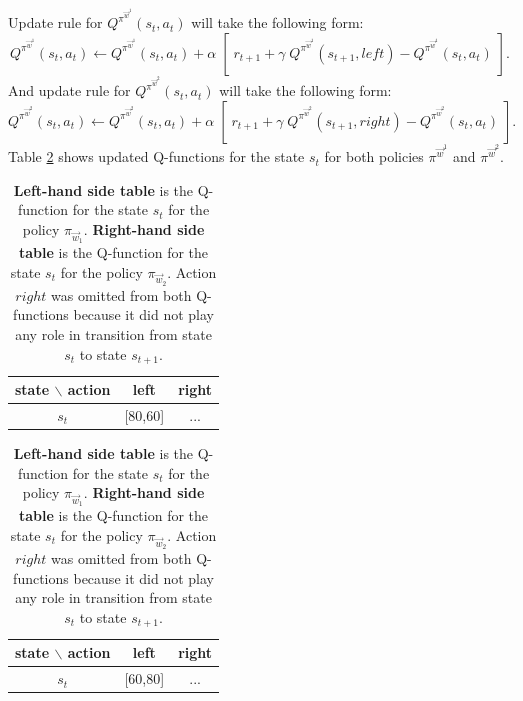 {Update rule for $ Q^{ \pi^{\vec{w}^{1}} }(s_{t},a_{t}) $ will take the following form:
$$ Q^{ \pi^{\vec{w}^{1}} }(s_{t},a_{t}) \leftarrow Q^{ \pi^{\vec{w}^{1}} }(s_{t},a_{t}) + \alpha \; \left[\;r_{t+1} + \gamma\; Q^{ \pi^{\vec{w}^{1}} }(s_{t+1},left) - Q^{ \pi^{\vec{w}^{1}} }(s_{t},a_{t})\;\right]. $$
And update rule for $ Q^{ \pi^{\vec{w}^{2}} }(s_{t},a_{t}) $ will take the following form:
$$ Q^{ \pi^{\vec{w}^{2}} }(s_{t},a_{t}) \leftarrow Q^{ \pi^{\vec{w}^{2}} }(s_{t},a_{t}) + \alpha \; \left[\;r_{t+1} + \gamma\; Q^{ \pi^{\vec{w}^{2}} }(s_{t+1},right) - Q^{ \pi^{\vec{w}^{2}} }(s_{t},a_{t})\;\right]. $$
Table \ref{table:updatedQfunctionsfortplusone} shows updated Q-functions for the state $s_{t}$ for both policies $\pi^{\vec{w}^{1}}$ and $\pi^{\vec{w}^{2}}$.

{\renewcommand{\arraystretch}{1.2}
\begin{table}[!htb]
    \caption{\textbf{Left-hand side table} is the Q-function for the state $s_{t}$ for the policy $ \pi_{\vec{w}_{1}} $. \textbf{Right-hand side table} is the Q-function for the state $s_{t}$ for the policy $ \pi_{\vec{w}_{2}} $. Action $right$ was omitted from both Q-functions because it did not play any role in transition from state $s_{t}$ to state $s_{t+1}$.}
    \begin{minipage}{.5\linewidth}
      \centering
        \begin{tabular}{c|c|c}
            state $\backslash$ action & left & right \\
            \hline
            $s_{t}$ & [80,60] & ...
        \end{tabular}
    \end{minipage}%
    \begin{minipage}{.5\linewidth}
      \centering
        \begin{tabular}{c|c|c}
            state $\backslash$ action & left & right \\
            \hline
            $s_{t}$ & [60,80] & ...
        \end{tabular}
    \end{minipage}
    \label{table:updatedQfunctionsfortplusone}
\end{table}

}}
